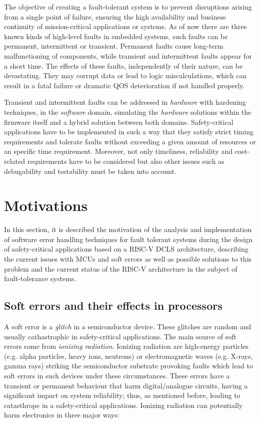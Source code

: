 \documentclass[10pt, a4paper]{report}
\begin{document}
The objective of creating a fault-tolerant system is to prevent disruptions
arising from a single point of failure, ensuring the high availability and
business continuity of mission-critical applications or systems. As of now there
are three known kinds of high-level faults in embedded systems, such faults can 
be permanent, intermittent or transient. Permanent faults cause long-term 
malfunctioning of components, while transient and intermittent faults appear for 
a short time. The effects of these faults, independently of their nature, can be 
devastating. They may corrupt data or lead to logic miscalculations, which can 
result in a fatal failure or dramatic \acrshort{QOS} deterioration if not 
handled properly. 

Transient and intermittent faults can be addressed in \emph{hardware} with
hardening techniques, in the \emph{software} domain, simulating the
\emph{hardware} solutions within the firmware itself and a hybrid solution
between both domains. Safety-critical applications have to be implemented in 
such a way that they satisfy strict timing requirements and tolerate faults 
without exceeding a given amount of resources or an specific time requirement. 
Moreover, not only timeliness, reliability and cost-related requirements have to 
be considered but also other issues such as debugability and testability must be
taken into account.

\section{Motivations}\label{motivations}

In this section, it is described the motivation of the analysis and 
implementation of software error handling techniques for fault tolerant systems 
during the design of safety-critical applications based on a RISC-V 
\acrshort{DCLS} architecture, describing the current issues with 
\acrshort{MCU}s and soft errors as well as possible solutions to this problem
and the current status of the RISC-V architecture in the subject of
fault-tolerance systems.

\subsection{Soft errors and their effects in processors}\label{soft_errors}

A soft error is a \emph{glitch} in a semiconductor device. These glitches are
random and usually cathastrophic in safety-critical applications. The main 
source of soft errors come from \emph{ionizing radiation}. Ionizing radiation 
are high-energy particles (e.g. alpha particles, heavy ions, neutrons) or
electromagnetic waves (e.g. X-rays, gamma rays) striking the semiconductor
substrate provoking faults which lead to soft errors in such devices under
these circumstances. These errors have a transient or permanent behaviour that 
harm digital/analogue circuits, having a significant impact on system 
reliability; thus, as mentioned before, leading to catasthrope in a 
safety-critical applications. Ionizing radiation can potentially harm 
electronics in three major ways:
\end{document}

